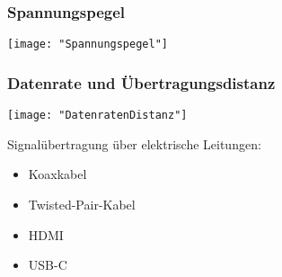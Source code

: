 
\subsubsection{Spannungspegel}
\begin{minipage}[t]{0.3\textwidth}
	\vspace{0pt}								%
	\texttt{[image: "Spannungspegel"]}
\end{minipage}\hspace{0.05\textwidth}
\begin{minipage}[t]{0.65\textwidth}
	\vspace{0pt}								%
	
\end{minipage}
\vspace{2mm}


\subsubsection{Datenrate und Übertragungsdistanz}
\begin{minipage}[t]{0.3\textwidth}
	\vspace{0pt}								%
	\texttt{[image: "DatenratenDistanz"]}
\end{minipage}\hspace{0.05\textwidth}
\begin{minipage}[t]{0.65\textwidth}
	\vspace{0pt}
	Signalübertragung über elektrische Leitungen:								%
	\begin{itemize}
		\item Koaxkabel
		\item Twisted-Pair-Kabel
		\item HDMI
		\item USB-C
	\end{itemize}
\end{minipage}
\vspace{2mm}




